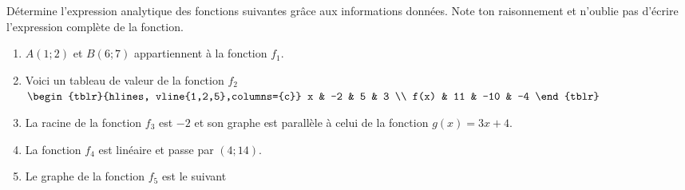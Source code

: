 \documentclass[a4paper, 12pt, parskip=half-]{scrartcl}
\begin{document}
\begin{exercise}[points=10]
    Détermine l'expression analytique des fonctions suivantes grâce aux informations données. Note ton raisonnement et n'oublie pas d'écrire l'expression complète de la fonction.
    \begin{enumerate}
        \item
              $A(1;2)$ et $B(6;7)$ appartiennent à la fonction $f_1$.
        \item
              Voici un tableau de valeur de la fonction $f_2$
              \hfil
              $\begin{tblr}{hlines, vline{1,2,5},columns={c}}
                      x    & -2 & 5   & 3  \\
                      f(x) & 11 & -10 & -4
                  \end{tblr}$
        \item
              La racine de la fonction $f_3$ est $-2$ et son graphe est parallèle à celui de la fonction $g(x)=3x + 4$.
        \item
              La fonction $f_4$ est linéaire et passe par $(4;14)$.
        \item
              Le graphe de la fonction $f_5$ est le suivant\hfil 
    \end{enumerate}
\end{exercise}
\end{document}
